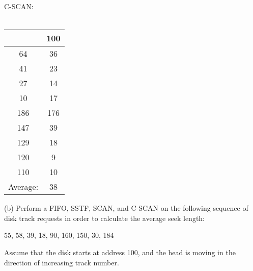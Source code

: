 \documentclass{article}
\begin{document}
\begin{minipage}[t]{0.25\textwidth}
C-SCAN:\\\\
\begin{tabular}{c|c}
& 100\\
\hline
64 & 36\\
41 & 23\\
27 & 14\\
10 & 17\\
186 & 176\\
147 & 39\\
129 & 18\\
120 & 9\\
110 & 10\\
\hline
Average: & 38
\end{tabular}
\end{minipage}

\vspace{0.5cm}
\noindent (b) Perform a FIFO, SSTF, SCAN, and C-SCAN on the following sequence of disk track requests
in order to calculate the average seek length:
\begin{center}
55, 58, 39, 18, 90, 160, 150, 30, 184
\end{center}
Assume that the disk starts at address 100, and the head is moving in the direction
of increasing track number.
\end{document}
